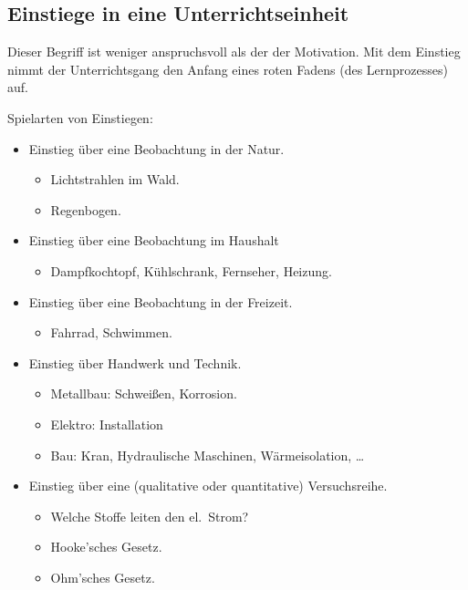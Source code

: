 \subsection{Einstiege in eine Unterrichtseinheit}

Dieser Begriff ist weniger anspruchsvoll als der der Motivation.
Mit dem Einstieg nimmt der Unterrichtsgang den Anfang eines
roten Fadens (des Lernprozesses) auf.

Spielarten von Einstiegen:
\begin{itemize}
	\item
	Einstieg \"{u}ber eine Beobachtung in der Natur.
	\begin{itemize}
		\item
		Lichtstrahlen im Wald.
		\item
		Regenbogen.
	\end{itemize}

	\item
	Einstieg \"{u}ber eine Beobachtung im Haushalt
	\begin{itemize}
		\item
		Dampfkochtopf, K\"{u}hlschrank, Fernseher, Heizung.
		\end{itemize}
		
		\item
		Einstieg \"{u}ber eine Beobachtung in der Freizeit.
		\begin{itemize}
		\item
		Fahrrad, Schwimmen.
	\end{itemize}
	
	\item
	Einstieg \"{u}ber Handwerk und Technik.
	\begin{itemize}
	\item
	Metallbau: Schwei{\ss}en, Korrosion.
	\item
	Elektro: Installation
	\item
	Bau: Kran, Hydraulische Maschinen, W\"{a}rmeisolation, \dots
	\end{itemize}
	
	\item
	Einstieg \"{u}ber eine (qualitative oder quantitative)
	Versuchsreihe.
	\begin{itemize}
	\item
	Welche Stoffe leiten den el.\ Strom?
	\item
	Hooke'sches Gesetz.
	\item
	Ohm'sches Gesetz.
	\end{itemize}
	

\end{itemize}

